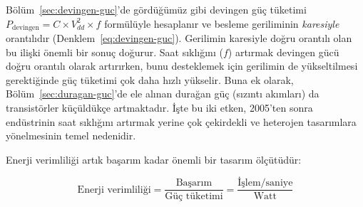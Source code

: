 Bölüm~\ref{sec:devingen-guc}'de gördüğümüz gibi devingen güç tüketimi $P_{\text{devingen}} = C \times V_{dd}^2 \times f$ formülüyle hesaplanır ve besleme geriliminin \emph{karesiyle} orantılıdır (Denklem~\ref{eq:devingen-guc}). Gerilimin karesiyle doğru orantılı olan bu ilişki önemli bir sonuç doğurur. Saat sıklığını ($f$) artırmak devingen gücü doğru orantılı olarak artırırken, bunu desteklemek için gerilimin de yükseltilmesi gerektiğinde güç tüketimi çok daha hızlı yükselir. Buna ek olarak, Bölüm~\ref{sec:duragan-guc}'de ele alınan durağan güç (sızıntı akımları) da transistörler küçüldükçe artmaktadır. İşte bu iki etken, 2005'ten sonra endüstrinin saat sıklığını artırmak yerine çok çekirdekli ve heterojen tasarımlara yönelmesinin temel nedenidir.

Enerji verimliliği artık başarım kadar önemli bir tasarım ölçütüdür:

\begin{equation}
\text{Enerji verimliliği} = \frac{\text{Başarım}}{\text{Güç tüketimi}} = \frac{\text{İşlem/saniye}}{\text{Watt}}
\label{eq:enerji-verimlilik}
\end{equation}

